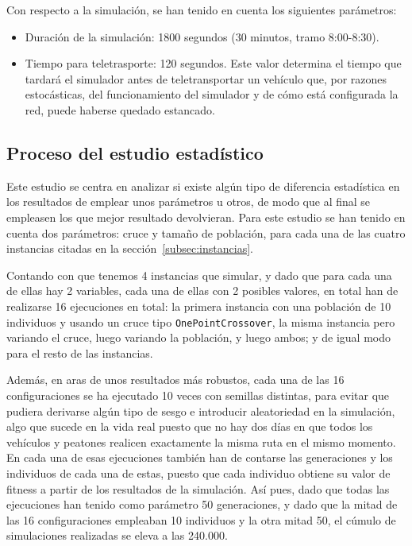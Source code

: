Con respecto a la simulación, se han tenido en cuenta los siguientes parámetros:

\begin{itemize}
    \item Duración de la simulación: 1800 segundos (30 minutos, tramo 8:00-8:30).
    \item Tiempo para teletrasporte: 120 segundos. Este valor determina el tiempo que tardará el simulador antes de teletransportar un vehículo que, por razones estocásticas, del funcionamiento del simulador y de cómo está configurada la red, puede haberse quedado estancado.
\end{itemize}


\subsection{Proceso del estudio estadístico}

Este estudio se centra en analizar si existe algún tipo de diferencia estadística en los resultados de emplear unos parámetros u otros, de modo que al final se empleasen los que mejor resultado devolvieran. Para este estudio se han tenido en cuenta dos parámetros: cruce y tamaño de población, para cada una de las  cuatro instancias citadas en la sección~\ref{subsec:instancias}.

Contando con que tenemos 4 instancias que simular, y dado que para cada una de ellas hay 2 variables, cada una de ellas con 2 posibles valores, en total han de realizarse 16 ejecuciones en total: la primera instancia con una población de 10 individuos y usando un cruce tipo \texttt{OnePointCrossover}, la misma instancia pero variando el cruce, luego variando la población, y luego ambos; y de igual modo para el resto de las instancias.

Además, en aras de unos resultados más robustos, cada una de las 16 configuraciones se ha ejecutado 10 veces con semillas distintas, para evitar que pudiera derivarse algún tipo de sesgo e introducir aleatoriedad en la simulación, algo que sucede en la vida real puesto que no hay dos días en que todos los vehículos y peatones realicen exactamente la misma ruta en el mismo momento. En cada una de esas ejecuciones también han de contarse las generaciones y los individuos de cada una de estas, puesto que cada individuo obtiene su valor de fitness a partir de los resultados de la simulación. Así pues, dado que todas las ejecuciones han tenido como parámetro 50 generaciones, y dado que la mitad de las 16 configuraciones empleaban 10 individuos y la otra mitad 50, el cúmulo de simulaciones realizadas se eleva a las 240.000.

